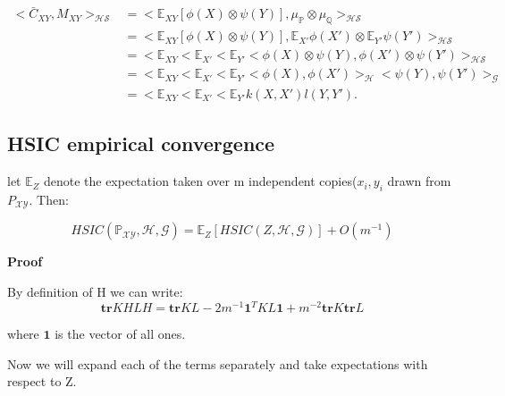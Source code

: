 \begin{equation}{}
\begin{split}
<\bar{C}_{XY},M_{XY}>_{\mathcal{HS}} 
& = <\mathbb{E}_{XY}[\phi(X) \otimes \psi(Y)],\mu_{\mathbb{P}}\otimes\mu_{\mathbb{Q}}>_{\mathcal{HS}} \\
& = <\mathbb{E}_{XY}[\phi(X) \otimes \psi(Y)],\mathbb{E}_{X'}\phi(X')\otimes\mathbb{E}_{Y'}\psi(Y')>_{\mathcal{HS}} \\
& = <\mathbb{E}_{XY}<\mathbb{E}_{X'}<\mathbb{E}_{Y'}<\phi(X) \otimes \psi(Y),\phi(X') \otimes \psi(Y')>_{\mathcal{HS}} \\
& = <\mathbb{E}_{XY}<\mathbb{E}_{X'}<\mathbb{E}_{Y'}<\phi(X),\phi(X')>_{\mathcal{H}}<\psi(Y),\psi(Y')>_{\mathcal{G}} \\
& = <\mathbb{E}_{XY}<\mathbb{E}_{X'}<\mathbb{E}_{Y'}k(X,X')l(Y,Y').
\end{split}
\end{equation}
\newpage
\subsection{HSIC empirical convergence \label{P:EXPHSIC}}
\begin{thm}
let $\mathbb{E}_{Z}$ denote the expectation taken over m independent copies($x_{i},y_{i}$ drawn from ${P}_{\mathcal{X}\mathcal{Y}}$. Then:

\vspace{5mm}
$$HSIC(\mathbb{P}_{\mathcal{X}\mathcal{Y}},\mathcal{H},\mathcal{G}) = \mathbb{E}_{Z}[HSIC(Z,\mathcal{H},\mathcal{G})] + O(m^{-1})$$
\end{thm}
\textbf{Proof}

By definition of H we can write:
\vspace{5mm}
$$
\textbf{tr}KHLH = \textbf{tr}KL - 2m^{-1}\mathbf{1}^{T}KL\mathbf{1} + m^{-2}\textbf{tr}K\textbf{tr}L
$$

where $\mathbf{1}$ is the vector of all ones.

Now we will expand each of the terms separately and take expectations with respect to Z.

